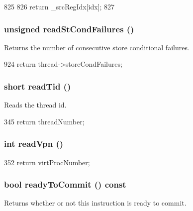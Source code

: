 \begin{DoxyCode}
825     {
826         return _srcRegIdx[idx];
827     }
\end{DoxyCode}
\hypertarget{classInOrderDynInst_a25b995a791e41965e088d8bf3f2bf859}{
\subsubsection[{readStCondFailures}]{\setlength{\rightskip}{0pt plus 5cm}unsigned readStCondFailures ()}}
\label{classInOrderDynInst_a25b995a791e41965e088d8bf3f2bf859}
Returns the number of consecutive store conditional failures. 


\begin{DoxyCode}
924     { return thread->storeCondFailures; }
\end{DoxyCode}
\hypertarget{classInOrderDynInst_ae9a8114c68d03d48ab3bcf7aab6745fc}{
\subsubsection[{readTid}]{\setlength{\rightskip}{0pt plus 5cm}short readTid ()}}
\label{classInOrderDynInst_ae9a8114c68d03d48ab3bcf7aab6745fc}
Reads the thread id. 


\begin{DoxyCode}
345 { return threadNumber; }
\end{DoxyCode}
\hypertarget{classInOrderDynInst_a4f7740a5012b416112dfe30f37328efc}{
\subsubsection[{readVpn}]{\setlength{\rightskip}{0pt plus 5cm}int readVpn ()}}
\label{classInOrderDynInst_a4f7740a5012b416112dfe30f37328efc}



\begin{DoxyCode}
352 { return virtProcNumber; }
\end{DoxyCode}
\hypertarget{classInOrderDynInst_a0bfca6b2400cf8496f4e685668839861}{
\subsubsection[{readyToCommit}]{\setlength{\rightskip}{0pt plus 5cm}bool readyToCommit () const}}
\label{classInOrderDynInst_a0bfca6b2400cf8496f4e685668839861}
Returns whether or not this instruction is ready to commit. 


